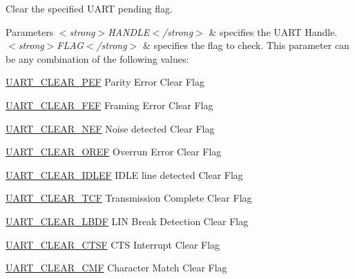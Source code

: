 Clear the specified U\+A\+RT pending flag. 


\begin{DoxyParams}{Parameters}
{\em $<$strong$>$\+H\+A\+N\+D\+L\+E$<$/strong$>$} & specifies the U\+A\+RT Handle. \\
\hline
{\em $<$strong$>$\+F\+L\+A\+G$<$/strong$>$} & specifies the flag to check. This parameter can be any combination of the following values\+: \begin{DoxyItemize}
\item \mbox{\hyperlink{group___u_a_r_t___i_t___c_l_e_a_r___flags_ga9c2aef8048dd09ea5e72d69c63026f02}{U\+A\+R\+T\+\_\+\+C\+L\+E\+A\+R\+\_\+\+P\+EF}} Parity Error Clear Flag \item \mbox{\hyperlink{group___u_a_r_t___i_t___c_l_e_a_r___flags_ga2040edf7a1daa2e9f352364e285ef5c3}{U\+A\+R\+T\+\_\+\+C\+L\+E\+A\+R\+\_\+\+F\+EF}} Framing Error Clear Flag \item \mbox{\hyperlink{group___u_a_r_t___i_t___c_l_e_a_r___flags_gad5b9aafb495296d917a5d85e63383396}{U\+A\+R\+T\+\_\+\+C\+L\+E\+A\+R\+\_\+\+N\+EF}} Noise detected Clear Flag \item \mbox{\hyperlink{group___u_a_r_t___i_t___c_l_e_a_r___flags_ga3bc97b70293f9a7bf8cc21a74094afad}{U\+A\+R\+T\+\_\+\+C\+L\+E\+A\+R\+\_\+\+O\+R\+EF}} Overrun Error Clear Flag \item \mbox{\hyperlink{group___u_a_r_t___i_t___c_l_e_a_r___flags_ga75ee9be0ac2236931ef3d9514e7dedf4}{U\+A\+R\+T\+\_\+\+C\+L\+E\+A\+R\+\_\+\+I\+D\+L\+EF}} I\+D\+LE line detected Clear Flag \item \mbox{\hyperlink{group___u_a_r_t___i_t___c_l_e_a_r___flags_gadfbfe4df408d1d09ff2adc1ddad3de09}{U\+A\+R\+T\+\_\+\+C\+L\+E\+A\+R\+\_\+\+T\+CF}} Transmission Complete Clear Flag \item \mbox{\hyperlink{group___u_a_r_t___i_t___c_l_e_a_r___flags_ga030414d9a93ad994156210644634b73c}{U\+A\+R\+T\+\_\+\+C\+L\+E\+A\+R\+\_\+\+L\+B\+DF}} L\+IN Break Detection Clear Flag \item \mbox{\hyperlink{group___u_a_r_t___i_t___c_l_e_a_r___flags_gabe0f3bc774ad0b9319732da3be8374cf}{U\+A\+R\+T\+\_\+\+C\+L\+E\+A\+R\+\_\+\+C\+T\+SF}} C\+TS Interrupt Clear Flag \item \mbox{\hyperlink{group___u_a_r_t___i_t___c_l_e_a_r___flags_ga5815698abf54d69b752bd2c43c2d6ad3}{U\+A\+R\+T\+\_\+\+C\+L\+E\+A\+R\+\_\+\+C\+MF}} Character Match Clear Flag \end{DoxyItemize}
\\
\hline
\end{DoxyParams}

